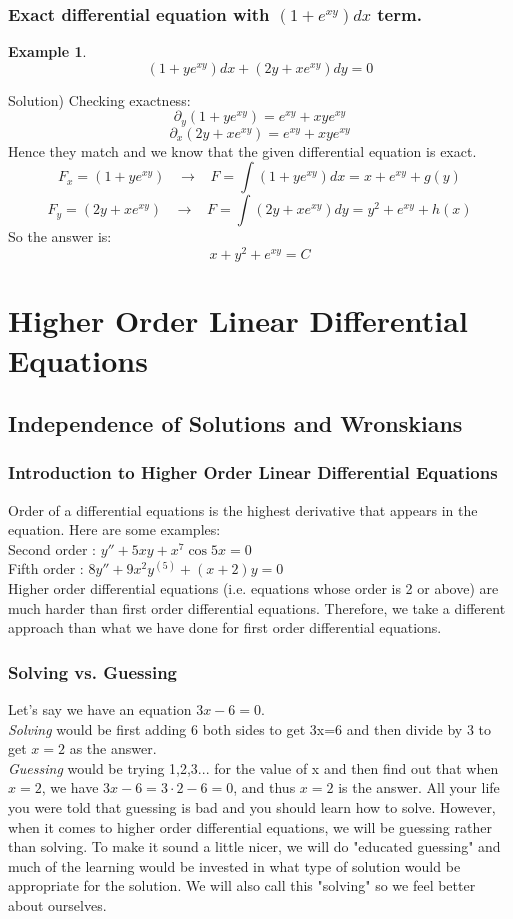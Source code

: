 \documentclass[12pt]{report}
\newtheorem{ex}{Example}[section]
\begin{document}
\subsection*{Exact differential equation with $(1+ e^{xy})dx$ term.}
\begin{ex}
$$(1+y e^{xy})dx +(2y+x e^{xy})dy =0$$
\end{ex}
Solution)
Checking exactness:
$$\partial_y (1+y e^{xy}) = e^{xy}+ xy e^{xy}$$
$$\partial_x (2y+x e^{xy}) = e^{xy}+ xy e^{xy}$$
Hence they match and we know that the given differential equation is exact.
$$F_x = (1+y e^{xy})\; \; \; \rightarrow \; \; \; F= \int (1+y e^{xy}) dx = x + e^{xy} + g(y) $$
$$F_y = (2y+x e^{xy})\; \; \; \rightarrow \; \; \; F= \int (2y+x e^{xy}) dy =  y^2 + e^{xy} + h(x)$$
So the answer is:
$$ x+ y^2 +e^{xy} =C$$

\chapter{Higher Order Linear Differential Equations}
\section{Independence of Solutions and Wronskians}
\subsection*{Introduction to Higher Order Linear Differential Equations}
Order of a differential equations is the highest derivative that appears in the equation. Here are some examples:\\

Second order : $y''+5xy+x^7 \cos 5x =0 $\\

Fifth order : $ 8y''+9x^2 y^{(5)} + (x+2)y=0$\\

Higher order differential equations (i.e. equations whose order is 2 or above) are much harder than first order differential equations.
Therefore, we take a different approach than what we have done for first order differential equations.

\subsection*{Solving vs. Guessing}
Let's say we have an equation  $3x-6=0$.\\
\textit{Solving} would be first adding 6 both sides to get 3x=6 and then divide by 3 to get $x=2$ as the answer.\\
\textit{Guessing} would be trying 1,2,3... for the value of x and then find out that when $x=2$, we have $3x-6=3\cdot 2-6=0$, and thus $x=2$ is the answer.
All your life you were told that guessing is bad and you should learn how to solve. However, when it comes to higher order differential equations, we will be guessing rather than solving.
To make it sound a little nicer, we will do "educated guessing" and much of the learning would be invested in what type of solution would be appropriate for the solution. We will also call this "solving" so we feel better about ourselves.
\end{document}
